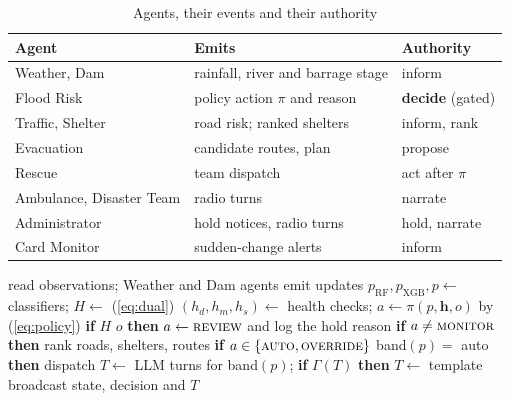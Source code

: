\documentclass[conference]{IEEEtran}
\begin{document}
\begin{table}[t]
\caption{Agents, their events and their authority}
\label{tab:roles}
\centering
\footnotesize
\setlength{\tabcolsep}{2.0pt}
\begin{tabular}{lll}
\toprule
Agent & Emits & Authority\\
\midrule
Weather, Dam & rainfall, river and barrage stage & inform\\
Flood Risk & policy action $\pi$ and reason & \textbf{decide} (gated)\\
Traffic, Shelter & road risk; ranked shelters & inform, rank\\
Evacuation & candidate routes, plan & propose\\
Rescue & team dispatch & act after $\pi$\\
Ambulance, Disaster Team & radio turns & narrate\\
Administrator & hold notices, radio turns & hold, narrate\\
Card Monitor & sudden-change alerts & inform\\
\bottomrule
\end{tabular}
\end{table}

\begin{algorithm}[t]
\caption{One pipeline tick (after the fix)}
\label{alg:tick}
\begin{algorithmic}[1]
\small
\STATE read observations; Weather and Dam agents emit updates
\STATE $p_{\mathrm{RF}},p_{\mathrm{XGB}},p \leftarrow$ classifiers; $H\leftarrow$ (\ref{eq:dual})
\STATE $(h_d,h_m,h_s)\leftarrow$ health checks; $a\leftarrow\pi(p,\mathbf{h},o)$ by (\ref{eq:policy})
\STATE \textbf{if} $H$ \AND \NOT $o$ \textbf{then} $a\leftarrow\textsc{review}$ and log the hold reason
\STATE \textbf{if} $a\neq\textsc{monitor}$ \textbf{then} rank roads, shelters, routes
\STATE \textbf{if} $a\in\{\textsc{auto},\textsc{override}\}$ \AND band$(p)=$ auto \textbf{then} dispatch
\STATE $T\leftarrow$ LLM turns for band$(p)$; \textbf{if} \NOT $\Gamma(T)$ \textbf{then} $T\leftarrow$ template
\STATE broadcast state, decision and $T$
\end{algorithmic}
\end{algorithm}
\end{document}
